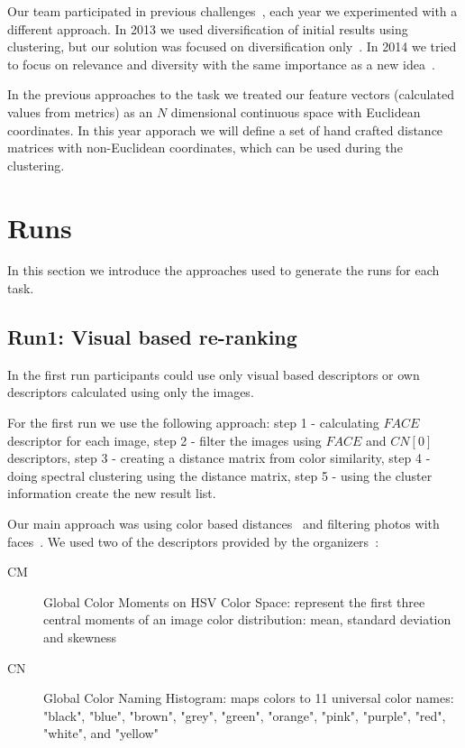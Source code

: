 \documentclass{acm_proc_article-me}
\begin{document}
Our team participated in previous challenges~\cite{szHucs2013bmemtm,Paroczi2014}, each year we experimented with a different approach. In 2013 we used diversification of initial results using clustering, but our solution was focused on diversification only~\cite{szHucs2013bmemtm}. In 2014 we tried to focus on relevance and diversity with the same importance as a new idea~\cite{Paroczi2014}.

In the previous approaches to the task we treated our feature vectors (calculated values from metrics) as an $N$ dimensional continuous space with Euclidean coordinates. In this year apporach we will define a set of hand crafted distance matrices with non-Euclidean coordinates, which can be used during the clustering. 

\section{Runs}

In this section we introduce the approaches used to generate the runs for each task.

\subsection{Run1: Visual based re-ranking}\label{run1}
In the first run participants could use only visual based descriptors or own descriptors calculated using only the images.

For the first run we use the following approach: step 1 - calculating $FACE$ descriptor for each image, step 2 - filter the images using $FACE$ and $CN[0]$ descriptors, step 3 - creating a distance matrix from color similarity, step 4 - doing spectral clustering using the distance matrix, step 5 - using the cluster information create the new result list.

Our main approach was using color based distances~\cite{Datta2008,Paramita2010} and filtering photos with faces~\cite{szHucs2013bmemtm,Paroczi2014}. We used two of the descriptors provided by the organizers~\cite{Task2015}:
\begin{description}
	\item[CM] Global Color Moments on HSV Color Space: represent the first three central moments of an image color distribution: mean, standard deviation and skewness
	\item [CN] Global Color Naming Histogram: maps colors to 11 universal color names: "black", "blue", "brown", "grey", "green", "orange", "pink", "purple", "red", "white", and "yellow"
\end{description}
\end{document}
